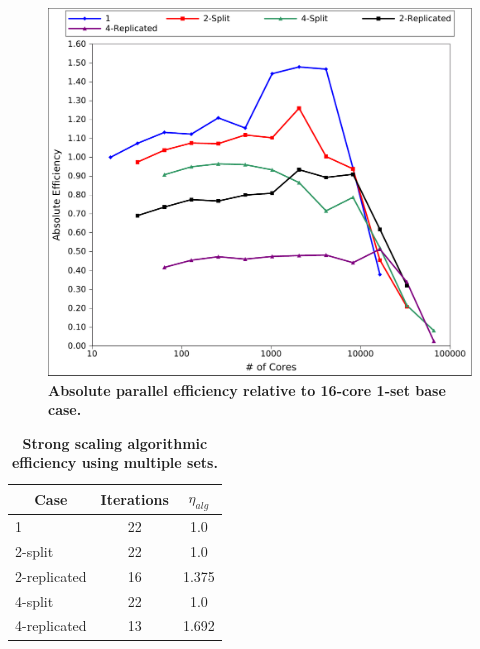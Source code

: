 \begin{figure}[t!]
  \begin{center}
    \includegraphics[width=6in]{chapters/parallel_mc/titan_strong_ms_eff.pdf}
  \end{center}
  \caption{\textbf{Absolute parallel efficiency relative to 16-core
      1-set base case.}}
  \label{fig:titan_strong_ms_eff}
\end{figure}

\begin{table}[h!]
  \begin{center}
    \begin{tabular}{lcc}\hline\hline
      \multicolumn{1}{c}{Case}& 
      \multicolumn{1}{c}{Iterations}&
      \multicolumn{1}{c}{$\eta_{alg}$} \\\hline
      1 & 22 & 1.0 \\
      2-split & 22 & 1.0 \\
      2-replicated & 16 & 1.375 \\
      4-split & 22 & 1.0 \\
      4-replicated & 13 & 1.692 \\
      \hline\hline
    \end{tabular}
  \end{center}
  \caption{\textbf{Strong scaling algorithmic efficiency using
      multiple sets.}}
  \label{tab:ms_strong_alg_eff}
\end{table}

